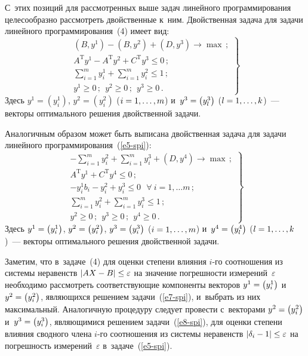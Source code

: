 \begin{multicols}{2}
  С~этих позиций для рассмотренных выше задач линейного
программирования целесообразно рассмотреть двойственные к~ним.
Двойственная задача для задачи линейного программирования~(4) имеет вид:
  \begin{equation}
  \left.
  \begin{array}{c}
  \left( B, y^1\right) -\left( B,y^2\right) +\left( D,y^3\right) \to \max\,;\\[6pt]
  A^{\mathrm{T}} y^1 -A^{\mathrm{T}} y^2 +C^{\mathrm{T}} y^3\leq 0\,;\\[3pt]
\displaystyle  \sum\limits_{i=1}^m y_i^1 +\sum\limits_{i=1}^m y_i^2 \leq 1\,;\\[12pt]
  y^1\geq 0\,;\ \ y^2\geq 0\,;\ \ y^3\geq 0\,.
  \end{array}
  \right\}
  \label{e7-spi}
  \end{equation}
  Здесь $y^1=\left( y_i^1\right)$,  $y^2=\left( y_i^2\right)$ ($i\hm= 1,\ldots ,m$)
и~$y^3\hm= \left( y_l^3\right)$ ($l\hm= 1,\ldots ,k$)~--- векторы оптимального
решения двойственной задачи.

  Аналогичным образом может быть выписана двойственная задача для задачи
линейного программирования~(\ref{e5-spi}):
  \begin{equation}
  \left.
  \begin{array}{c}
  \displaystyle -\sum\limits_{i=1}^m y_i^2 +\sum\limits_{i=1}^m y_i^3 +\left(
D,y^4\right)\to\max\,;\\[12pt]
  A^{\mathrm{T}} y^1 +C^{\mathrm{T}}y^4 \leq 0\,;\\[4pt]
  -y_i^1 b_i -y_i^2 +y_i^3 \leq 0\ \ \ \forall\ i=1,\ldots m\,;\\[6pt]
  \displaystyle \sum\limits_{i=1}^m y_i^2 +\sum\limits_{i=1}^m y_i^3\leq
1\,;\\[6pt]
  y^2\geq0\,;\  \ y^3\geq0\,;\ \ y^4\geq0\,.
  \end{array}
  \right\}
  \label{e8-spi}
  \end{equation}
  Здесь $y^1\hm= \left( y_i^1\right)$, $y^2\hm= \left( y_i^2\right)$, $y^3\hm=
\left( y_i^3\right)$ ($i\hm= 1,\ldots ,m$) и~$y^4\hm = \left( y_l^4\right)$ ($l\hm=
1,\ldots , k$)~--- векторы оптимального решения двойственной задачи.

  Заметим, что в~задаче~(4) для оценки степени влияния $i$-го соотношения из
системы неравенств $\vert AX\hm- B\vert \hm \leq \varepsilon$ на значение
погрешности измерений~$\varepsilon$ необходимо рассмотреть
соответствующие компоненты векторов $y^1\hm= \left( y_i^1\right)$ и~$y^2\hm=
\left( y_i^2\right)$, являющихся решением задачи~(\ref{e7-spi}), и~выбрать из
них максимальный. Аналогичную процедуру следует провести с~векторами
$y^2\hm= \left( y_i^2\right)$ и~$y^3\hm= \left( y_i^3\right)$, являющимися
решением задачи~(\ref{e8-spi}), для оценки степени влияния сводного члена
  $i$-го соотношения из системы неравенств $\left\vert \delta_i\hm- 1\right\vert
\hm\leq\varepsilon$ на погрешность измерений~$\varepsilon$
  в~задаче~(\ref{e5-spi}).


\end{multicols}
